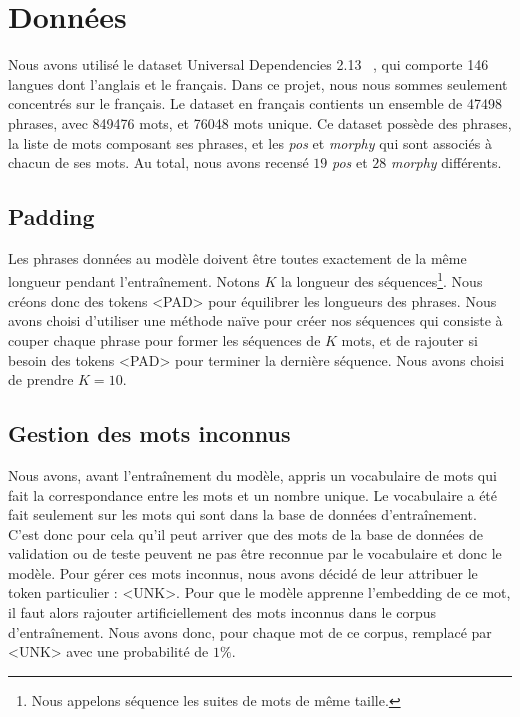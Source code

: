 \documentclass[a4paper]{article}
\begin{document}
\section{Données}

Nous avons utilisé le dataset Universal Dependencies 2.13 ~\cite{11234/1-5287}, qui comporte 146 langues dont l'anglais
et le français. Dans ce projet, nous nous sommes seulement concentrés sur le français.
Le dataset en français contients un ensemble de 47498 phrases, avec 849476 mots, et 76048 mots unique.
Ce dataset possède des phrases, la liste de mots composant ses phrases,
et les \textit{pos} et \textit{morphy} qui sont associés à chacun de ses mots. Au total, nous avons recensé $19$ \textit{pos} et $28$ \textit{morphy} différents.

\subsection{Padding}

Les phrases données au modèle doivent être toutes exactement de la même longueur pendant l'entraînement. 
Notons $K$ la longueur des séquences\footnote{Nous appelons séquence les suites de mots de même taille.}. Nous créons donc des tokens <PAD> pour équilibrer les longueurs des phrases.
Nous avons choisi d'utiliser une méthode naïve pour créer nos séquences qui consiste à couper chaque phrase pour former les séquences
de $K$ mots, et de rajouter si besoin des tokens <PAD> pour terminer la dernière séquence. Nous avons choisi de prendre $K=10$.

\subsection{Gestion des mots inconnus}

Nous avons, avant l'entraînement du modèle, appris un vocabulaire de mots qui fait la correspondance entre les mots et un nombre unique.
Le vocabulaire a été fait seulement sur les mots qui sont dans la base de données d'entraînement. C'est donc pour cela qu'il peut
arriver que des mots de la base de données de validation ou de teste peuvent ne pas être reconnue par le vocabulaire et donc le modèle.
Pour gérer ces mots inconnus, nous avons décidé de leur attribuer le token particulier : <UNK>. Pour que le modèle
apprenne l'embedding de ce mot, il faut alors rajouter artificiellement des mots inconnus dans le corpus d'entraînement. Nous avons
donc, pour chaque mot de ce corpus, remplacé par <UNK> avec une probabilité de $1\%$.
\end{document}
